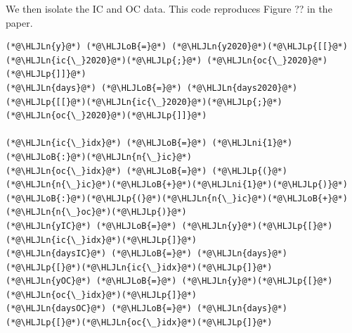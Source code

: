 \documentclass[12pt,a4paper]{article}
\newcommand{\HLJLn}[1]{#1}
\newcommand{\HLJLni}[1]{\textcolor[RGB]{59,151,46}{#1}}
\newcommand{\HLJLoB}[1]{\textcolor[RGB]{102,102,102}{\textbf{#1}}}
\newcommand{\HLJLp}[1]{#1}
\begin{document}
We then isolate the IC and OC data. This code reproduces Figure ?? in the paper.


\begin{lstlisting}
(*@\HLJLn{y}@*) (*@\HLJLoB{=}@*) (*@\HLJLn{y2020}@*)(*@\HLJLp{[[}@*)(*@\HLJLn{ic{\_}2020}@*)(*@\HLJLp{;}@*) (*@\HLJLn{oc{\_}2020}@*)(*@\HLJLp{]]}@*)
(*@\HLJLn{days}@*) (*@\HLJLoB{=}@*) (*@\HLJLn{days2020}@*)(*@\HLJLp{[[}@*)(*@\HLJLn{ic{\_}2020}@*)(*@\HLJLp{;}@*) (*@\HLJLn{oc{\_}2020}@*)(*@\HLJLp{]]}@*)

(*@\HLJLn{ic{\_}idx}@*) (*@\HLJLoB{=}@*) (*@\HLJLni{1}@*)(*@\HLJLoB{:}@*)(*@\HLJLn{n{\_}ic}@*)
(*@\HLJLn{oc{\_}idx}@*) (*@\HLJLoB{=}@*) (*@\HLJLp{(}@*)(*@\HLJLn{n{\_}ic}@*)(*@\HLJLoB{+}@*)(*@\HLJLni{1}@*)(*@\HLJLp{)}@*)(*@\HLJLoB{:}@*)(*@\HLJLp{(}@*)(*@\HLJLn{n{\_}ic}@*)(*@\HLJLoB{+}@*)(*@\HLJLn{n{\_}oc}@*)(*@\HLJLp{)}@*)
(*@\HLJLn{yIC}@*) (*@\HLJLoB{=}@*) (*@\HLJLn{y}@*)(*@\HLJLp{[}@*)(*@\HLJLn{ic{\_}idx}@*)(*@\HLJLp{]}@*)
(*@\HLJLn{daysIC}@*) (*@\HLJLoB{=}@*) (*@\HLJLn{days}@*)(*@\HLJLp{[}@*)(*@\HLJLn{ic{\_}idx}@*)(*@\HLJLp{]}@*)
(*@\HLJLn{yOC}@*) (*@\HLJLoB{=}@*) (*@\HLJLn{y}@*)(*@\HLJLp{[}@*)(*@\HLJLn{oc{\_}idx}@*)(*@\HLJLp{]}@*)
(*@\HLJLn{daysOC}@*) (*@\HLJLoB{=}@*) (*@\HLJLn{days}@*)(*@\HLJLp{[}@*)(*@\HLJLn{oc{\_}idx}@*)(*@\HLJLp{]}@*)


\end{lstlisting}
\end{document}

